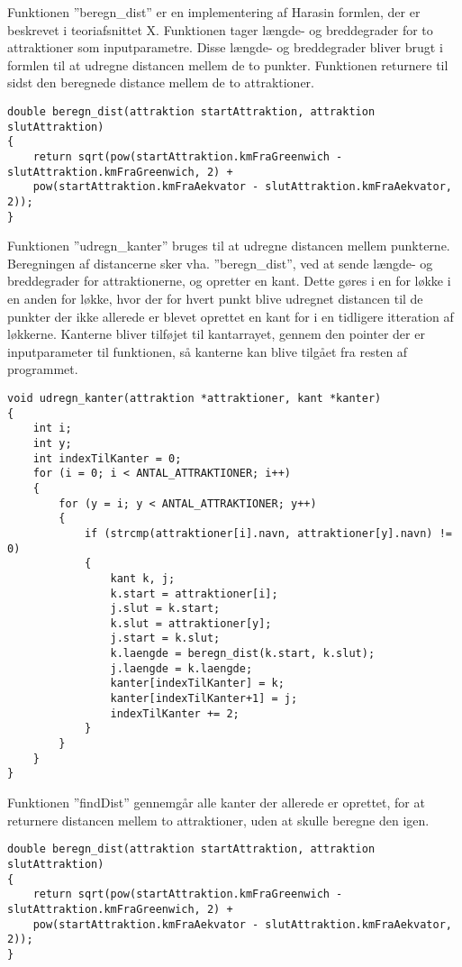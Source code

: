Funktionen ”beregn\_dist” er en implementering af Harasin formlen, der er beskrevet i teoriafsnittet X. Funktionen tager længde- og breddegrader for to attraktioner som inputparametre. Disse længde- og breddegrader bliver brugt i formlen til at udregne distancen mellem de to punkter. Funktionen returnere til sidst den beregnede distance mellem de to attraktioner.

\begin{lstlisting}
double beregn_dist(attraktion startAttraktion, attraktion slutAttraktion)
{
	return sqrt(pow(startAttraktion.kmFraGreenwich - slutAttraktion.kmFraGreenwich, 2) + 
	pow(startAttraktion.kmFraAekvator - slutAttraktion.kmFraAekvator, 2));
}
\end{lstlisting}

Funktionen ”udregn\_kanter” bruges til at udregne distancen mellem punkterne. Beregningen af distancerne sker vha. ”beregn\_dist”, ved at sende længde- og breddegrader for attraktionerne, og opretter en kant. Dette gøres i en for løkke i en anden for løkke, hvor der for hvert punkt blive udregnet distancen til de punkter der ikke allerede er blevet oprettet en kant for i en tidligere itteration af løkkerne. Kanterne bliver tilføjet til kantarrayet, gennem den pointer der er inputparameter til funktionen, så kanterne kan blive tilgået fra resten af programmet. 

\begin{lstlisting}
void udregn_kanter(attraktion *attraktioner, kant *kanter)
{
	int i;
	int y;
	int indexTilKanter = 0;
	for (i = 0; i < ANTAL_ATTRAKTIONER; i++)
	{
		for (y = i; y < ANTAL_ATTRAKTIONER; y++)
		{
			if (strcmp(attraktioner[i].navn, attraktioner[y].navn) != 0)
			{
				kant k, j;
				k.start = attraktioner[i];
				j.slut = k.start;
				k.slut = attraktioner[y];
				j.start = k.slut;
				k.laengde = beregn_dist(k.start, k.slut);
				j.laengde = k.laengde;
				kanter[indexTilKanter] = k;
				kanter[indexTilKanter+1] = j;
				indexTilKanter += 2;
			}
		}
	}
}
\end{lstlisting}

Funktionen ”findDist” gennemgår alle kanter der allerede er oprettet, for at returnere distancen mellem to attraktioner, uden at skulle beregne den igen.

\begin{lstlisting}
double beregn_dist(attraktion startAttraktion, attraktion slutAttraktion)
{
	return sqrt(pow(startAttraktion.kmFraGreenwich - slutAttraktion.kmFraGreenwich, 2) + 
	pow(startAttraktion.kmFraAekvator - slutAttraktion.kmFraAekvator, 2));
}
\end{lstlisting}

